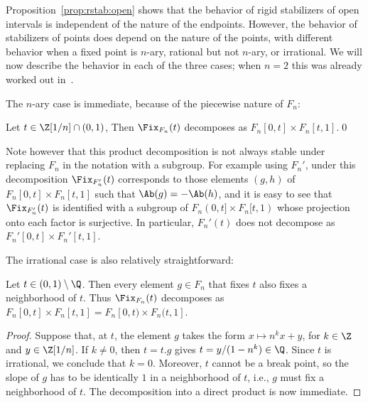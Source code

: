Proposition~\ref{prop:rstab:open} shows that the behavior of rigid stabilizers of open intervals is independent of the nature of the endpoints. However, the behavior of stabilizers of points does depend on the nature of the points, with different behavior when a fixed point is $n$-ary, rational but not $n$-ary, or irrational. We will now describe the behavior in each of the three cases; when $n = 2$ this was already worked out in~\cite{golansapir}.

The $n$-ary case is immediate, because of the piecewise nature of $F_n$:

\begin{lemm}
\label{lem:fix:nary}

Let $t \in \Z[1/n] \cap (0, 1)$, Then $\Fix_{F_n}(t)$ decomposes as $F_n[0, t] \times F_n[t, 1]$.\qed
\end{lemm}

Note however that this product decomposition is not always stable under replacing $F_n$ in the notation with a subgroup. For example using $F_n'$, under this decomposition $\Fix_{F_n'}(t)$ corresponds to those elements $(g, h)$ of $F_n[0, t] \times F_n[t, 1]$ such that $\Ab(g) = - \Ab(h)$, and it is easy to see that $\Fix_{F_n'}(t)$ is identified with a subgroup of $F_n(0, t] \times F_n[t, 1)$ whose projection onto each factor is surjective. In particular, $F_n'(t)$ does not decompose as $F_n'[0,t]\times F_n'[t,1]$.

The irrational case is also relatively straightforward:

\begin{lemm}
\label{lem:fix:irrational}

Let $t \in (0, 1) \setminus \Q$. Then every element $g \in F_n$ that fixes $t$ also fixes a neighborhood of $t$. Thus $\Fix_{F_n}(t)$ decomposes as $F_n[0, t] \times F_n[t, 1] = F_n[0, t) \times F_n(t, 1]$.
\end{lemm}

\begin{proof}
Suppose that, at $t$, the element $g$ takes the form $x \mapsto n^k x + y$, for $k \in \Z$ and $y \in \Z[1/n]$. If $k \neq 0$, then $t = t.g$ gives $t = y/(1-n^k) \in \Q$. Since $t$ is irrational, we conclude that $k=0$. Moreover, $t$ cannot be a break point, so the slope of $g$ has to be identically $1$ in a neighborhood of $t$, i.e., $g$ must fix a neighborhood of $t$. The decomposition into a direct product is now immediate.
\end{proof}

